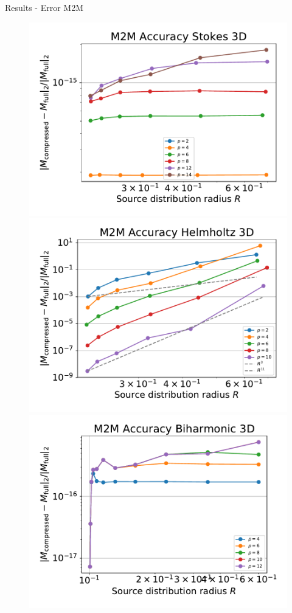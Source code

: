\documentclass[10pt]{beamer}
\begin{document}
\begin{frame}[fragile]{Results - Error M2M}
\begin{figure}
\includegraphics[scale=0.3]{figures/accuracy-stokes-3d.pdf}
\includegraphics[scale=0.3]{figures/accuracy-helmholtz-3d.pdf}
\includegraphics[scale=0.3]{figures/accuracy-biharmonic-3d.pdf}

\end{figure}
\end{frame}
\end{document}
